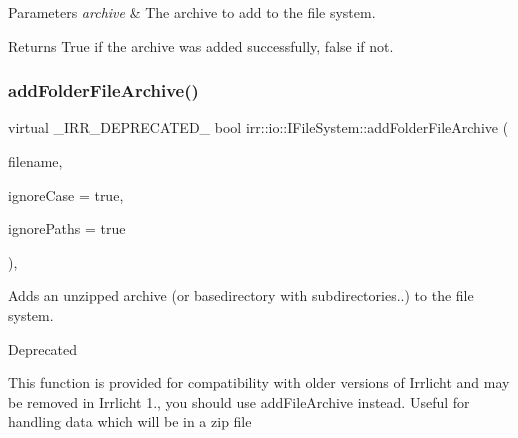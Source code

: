 \begin{DoxyParams}{Parameters}
{\em archive} & The archive to add to the file system. \\
\hline
\end{DoxyParams}
\begin{DoxyReturn}{Returns}
True if the archive was added successfully, false if not. 
\end{DoxyReturn}
\mbox{\label{classirr_1_1io_1_1IFileSystem_a7b5235a1473ff67d97f1487211762723}} 
\subsubsection{\texorpdfstring{add\+Folder\+File\+Archive()}{addFolderFileArchive()}\hspace{0.1cm}{\footnotesize\ttfamily [1/2]}}
{\footnotesize\ttfamily virtual \+\_\+\+I\+R\+R\+\_\+\+D\+E\+P\+R\+E\+C\+A\+T\+E\+D\+\_\+ bool irr\+::io\+::\+I\+File\+System\+::add\+Folder\+File\+Archive (\begin{DoxyParamCaption}\item[{const \hyperlink{namespaceirr_a9395eaea339bcb546b319e9c96bf7410}{c8} $\ast$}]{filename,  }\item[{bool}]{ignore\+Case = {\ttfamily true},  }\item[{bool}]{ignore\+Paths = {\ttfamily true} }\end{DoxyParamCaption})\hspace{0.3cm}{\ttfamily [inline]}, {\ttfamily [virtual]}}



Adds an unzipped archive (or basedirectory with subdirectories..) to the file system. 

\begin{DoxyRefDesc}{Deprecated}
\item[\hyperlink{deprecated__deprecated000003}{Deprecated}]This function is provided for compatibility with older versions of Irrlicht and may be removed in Irrlicht 1., you should use add\+File\+Archive instead. Useful for handling data which will be in a zip file \end{DoxyRefDesc}

